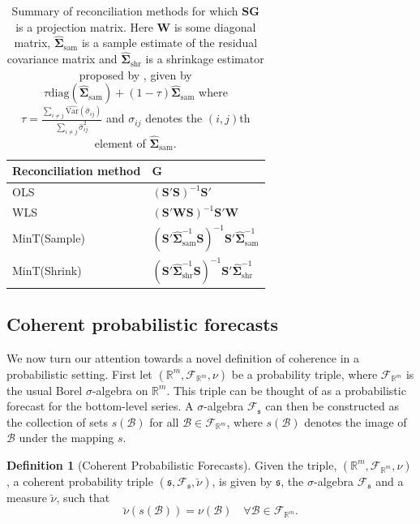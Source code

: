 \documentclass[11pt]{article}
\def\var{\text{Var}}
\theoremstyle{definition}
\newtheorem{definition}{Definition}[section]
\begin{document}
\begin{table}[!t]
	\caption{Summary of reconciliation methods for which $\bm{S}\bm{G}$ is a projection matrix. Here $\bm{W}$ is some diagonal matrix, $\hat{\bm{\Sigma}}_{\text{sam}}$ is a sample estimate of the residual covariance matrix and $\hat{\bm{\Sigma}}_{\text{shr}}$ is a shrinkage estimator proposed by \citet{Schafer2005}, given by $\tau \textrm{diag}(\hat{\bm{\Sigma}}_{\text{sam}})+(1-\tau)\hat{\bm{\Sigma}}_{\text{sam}}$ where $\tau = \displaystyle\frac{\sum_{i \neq j}\hat{\var}(\hat{\sigma}_{ij})}{\sum_{i \neq j}{\hat{\sigma}}^2_{ij}}$ and $\sigma_{ij}$ denotes the $(i,j)$th element of $\hat{\bm{\Sigma}}_{\text{sam}}$.} \label{tab:ReconMethods}
	\centering
	\begin{tabular}{l@{\hskip 0.4in}l}
		\toprule
		\textbf{Reconciliation method} & $\bm{G}$ \\
		\midrule
		OLS             & $(\bm{S}'\bm{S})^{-1}\bm{S}'$ \\
		WLS             & $(\bm{S}'\bm{W}\bm{S})^{-1}\bm{S}'\bm{W}$ \\
		MinT(Sample)    & $(\bm{S}'\hat{\bm{\Sigma}}_{\text{sam}}^{-1}\bm{S})^{-1}\bm{S}' \hat{\bm{\Sigma}}_{\text{sam}}^{-1}$  \\
		MinT(Shrink)    & $(\bm{S}'\hat{\bm{\Sigma}}_{\text{shr}}^{-1}\bm{S})^{-1}\bm{S}' \hat{\bm{\Sigma}}_{\text{shr}}^{-1}$  \\
		\bottomrule
	\end{tabular}
	\label{tab:recomethods}
\end{table}

\subsection{Coherent probabilistic forecasts}

We now turn our attention towards a novel definition of coherence in a probabilistic setting. First let $(\mathbb{R}^m, \mathscr{F}_{\mathbb{R}^m}, \nu)$ be a probability triple, where $\mathscr{F}_{\mathbb{R}^m}$ is the usual Borel $\sigma$-algebra on $\mathbb{R}^m$. This triple can be thought of as a probabilistic forecast for the bottom-level series. A $\sigma$-algebra $\mathscr{F}_{\mathfrak{s}}$ can then be constructed as the collection of sets $s(\mathcal{B})$ for all $\mathcal{B}\in \mathscr{F}_{\mathbb{R}^m}$, where $s(\mathcal{B})$ denotes the image of $\mathcal{B}$ under the mapping $s$.

\begin{definition}[Coherent Probabilistic Forecasts]\label{def:cohprob}
	Given the triple, $(\mathbb{R}^m, \mathscr{F}_{\mathbb{R}^m}, \nu)$, a coherent probability triple $(\mathfrak{s}, \mathscr{F}_{\mathfrak{s}}, \breve{\nu})$, is given by $\mathfrak{s}$, the $\sigma$-algebra $\mathscr{F}_{\mathfrak{s}}$ and a measure $\breve{\nu}$, such that
	\[
	\breve{\nu}(s(\mathcal{B})) = \nu(\mathcal{B}) \quad \forall \mathcal{B} \in \mathscr{F}_{\mathbb{R}^m}.
	\]
\end{definition}
\end{document}
